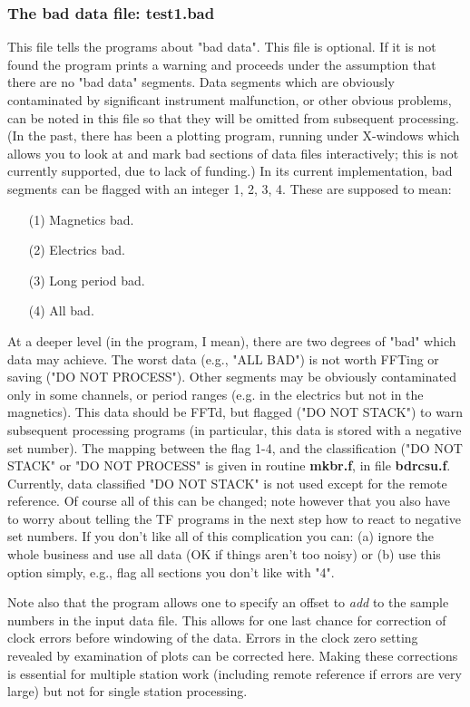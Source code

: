 \subsubsection{The bad data file:  test1.bad}

This file tells the programs about "bad data".
This file is optional.
If it is not found the program prints a warning and
proceeds under the assumption that there are
no "bad data" segments.
Data segments which are obviously contaminated by significant instrument
malfunction, or other obvious problems, can be noted in this file
so that they will be omitted from subsequent processing.
(In the past, there has been a plotting program, 
running under X-windows which allows
you to look at and mark bad sections of data files interactively;
this is not currently supported, due to lack of funding.)
In its current implementation, bad segments can be flagged with
an integer 1, 2, 3, 4.   These are supposed to mean:
\begin{itemize}
\item[(1)]
Magnetics bad.
\item[(2)]
Electrics bad.
\item[(3)]
Long period bad.
\item[(4)]
All bad.
\end{itemize}

At a deeper level (in the program, I mean),
there are two degrees of "bad"  which data may achieve.
The worst data (e.g., "ALL BAD") is not worth FFTing
or saving ("DO NOT PROCESS").
Other segments may be obviously contaminated only in some channels,
or period ranges
(e.g. in the electrics but not in the magnetics).
This data should be FFTd, but flagged ("DO NOT STACK")
to warn subsequent processing programs
(in particular, this data is stored with a negative set number).
The mapping between the flag 1-4, and the classification
("DO NOT STACK" or "DO NOT PROCESS" is given in routine {\bf mkbr.f},
in file {\bf bdrcsu.f}.
Currently, data classified "DO NOT STACK" is not used except
for the remote reference.
Of course all of this can be changed;
note however that you also have to worry about telling the TF
programs in the next step how to react
to negative set numbers.
If you don't like all of this complication you can:
(a) ignore  the whole business and use all data
(OK if things aren't too noisy) or (b) use this option simply,
e.g., flag all sections you don't like with "4".

Note also that the program allows one to
specify an offset to {\it add} to the sample numbers in the input data
file.
This allows for one last chance for
correction of clock errors before windowing of the data.
Errors in the clock zero setting revealed by
examination of plots can be corrected here.
Making these corrections is essential for multiple station work
(including remote reference if errors are
very large) but not for single station processing.

